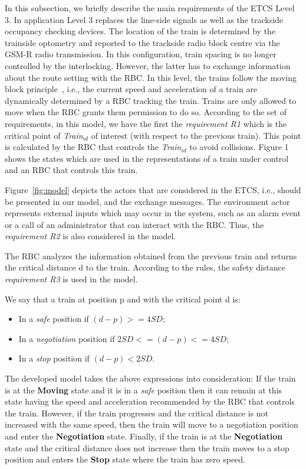 \documentclass{template/openetcs_article}
\begin{document}
In this subsection, we briefly describe the main requirements of the ETCS Level 3. In application Level 3 replaces the line-side signals as well as the trackside occupancy checking devices. The location of the train is determined by the trainside optometry and reported to the trackside radio block centre via the GSM-R radio transmission. In this configuration, train spacing is no longer controlled by the interlocking. However, the latter has to exchange information about the route setting with the RBC. In this level, the trains follow the moving block principle~\cite{platzer2009european}, i.e., the current speed and acceleration of a train are dynamically determined by a RBC tracking the train.  Trains are only allowed to move when the RBC grants them permission to do so. According to the set of requirements, in this model, we have the first the \textit{requirement R1} which is the critical point of \textit{Train$_{id}$} of interest (with respect to the previous train). This point is calculated by the RBC that controls the \textit{Train$_{id}$}  to avoid collisions. Figure 1 shows the states which are used in the representations of a train under control and an RBC that controls this train. 

Figure~\ref{fig:model} depicts the actors that are considered in the ETCS, i.e., should be presented in our model, and the exchange messages. The environment actor represents external inputs which may occur in the system, such as an alarm event or a call of an administrator that can interact with the RBC. Thus, the \textit{requirement R2} is also considered in the model.

The RBC analyzes the information obtained from the previous train and returns the critical distance d to the train. According to the rules, the safety distance \textit{requirement R3} is used in the model.

We say that a train at position p and with the critical point d is:

\begin{itemize}
\item In a \textit{safe} position if $(d - p) >= 4 SD$;
\item In a \textit{negotiation} position if $2 SD <=  (d - p) <=  4 SD$;
\item In a \textit{stop} position if $(d - p) < 2 SD$.
\end{itemize}

The developed model takes the above expressions into consideration: If the train is at the \textbf{Moving} state and it is in a \textit{safe} position then it can remain at this state having the speed and acceleration recommended by the RBC that controls the train. However, if the train progresses and the critical distance is not increased with the same speed, then the train will move to a negotiation position and enter the \textbf{Negotiation} state. Finally, if the train is at the \textbf{Negotiation} state and the critical distance does not increase then the train moves to a stop position and enters the \textbf{Stop} state where the train has zero speed. 
\end{document}
